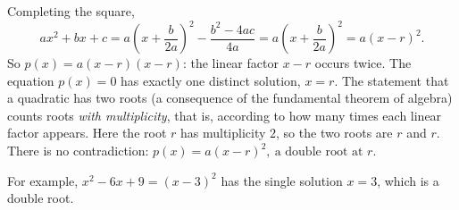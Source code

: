 Completing the square,
\[ax^2+bx+c=a\left(x+\dfrac {b}{2a}\right)^2-\dfrac{b^2-4ac}{4a}=a\left(x+\dfrac {b}{2a}\right)^2=a(x-r)^2 .\]
So $p(x)=a(x-r)(x-r)$: the linear factor $x-r$ occurs twice. The equation $p(x)=0$ has exactly one distinct solution, $x=r$. The statement that a quadratic has two roots (a consequence of the fundamental theorem of algebra) counts roots \emph{with multiplicity}, that is, according to how many times each linear factor appears. Here the root $r$ has multiplicity $2$, so the two roots are $r$ and $r$. There is no contradiction: $\boxed{p(x)=a(x-r)^2,\ \text{a double root at } r}$.

For example, $x^2-6x+9=(x-3)^2$ has the single solution $x=3$, which is a double root.

